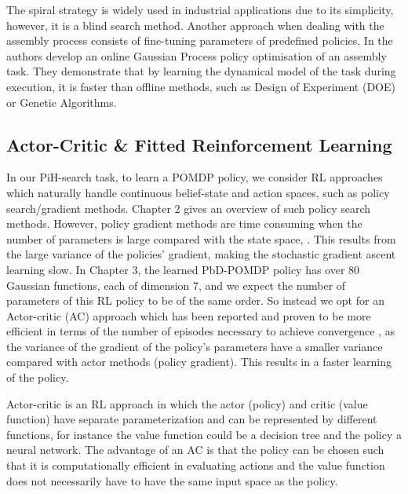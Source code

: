 The spiral strategy is widely used in industrial applications due to its simplicity, 
however, it is a blind search method. Another approach when dealing with the assembly
process consists of fine-tuning parameters of predefined policies. In \cite{online_gpr_icra_2014}
the authors develop an online Gaussian Process policy optimisation of an assembly task. They 
demonstrate that by learning the dynamical model of the task during execution, it is faster than offline methods, 
such as Design of Experiment (DOE) or Genetic Algorithms.


\subsection{Actor-Critic \& Fitted Reinforcement Learning}

In our PiH-search task, to learn a POMDP policy, we consider RL approaches which naturally handle continuous 
belief-state and action spaces, such as policy search/gradient methods. Chapter 2 gives an overview of 
such policy search methods. However, policy gradient methods are time consuming when the number of parameters 
is large compared with the state space, \cite{ACML_variance_2015}.
This results from the large variance of the policies' gradient, making the stochastic gradient ascent learning slow. 
In Chapter 3, the learned PbD-POMDP policy has over 80 Gaussian functions, each of dimension 7, and we expect the 
number of parameters of this RL policy to be of the same order. So instead we opt for an Actor-critic (AC) approach 
which has been reported and proven to be more efficient in terms of the number of episodes necessary to achieve 
convergence \citep{ac_survey_2012}, as the variance of the gradient of the policy's parameters have a smaller 
variance compared with actor methods (policy gradient). This results in a faster learning of the policy. 

Actor-critic \cite[Chap. 6.6]{sutton1998reinforcement} is an RL approach in which the actor (policy) and critic (value function) 
have separate parameterization and can be represented by different functions, for instance the value function could be a 
decision tree and the policy a neural network. The advantage of an AC is that the policy can be chosen such 
that it is computationally efficient in evaluating actions and the value function does not necessarily have to have
the same input space as the policy.  %

